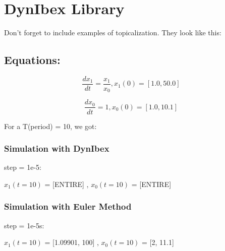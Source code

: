 \documentclass[12pt]{article}
\begin{document}
\section*{DynIbex Library}

Don't forget to include examples of topicalization.
They look like this:


\subsection{Equations:}


\begin{equation}
    \frac{dx_{1}}{dt} = \frac{x_{1}}{x_{0}},   x_{1}(0) = [1.0,50.0]
\end{equation}


\begin{equation}
    \frac{dx_{0}}{dt} = 1, x_{0}(0) = [1.0,10.1]
\end{equation}

For a T(period) = 10, we got: 

\subsubsection{Simulation with DynIbex}

step = 1e-5:


$x_{1}(t=10)$ = [ENTIRE] , 
$x_{0}(t=10)$ = [ENTIRE] 

\subsubsection{Simulation with Euler Method} 

step = 1e-5s:


$x_{1}(t=10)$ = [1.09901, 100] , 
$x_{0}(t=10)$ = [2, 11.1] 
\end{document}
